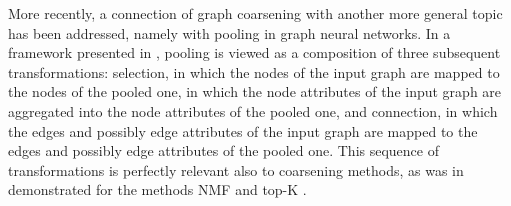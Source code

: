 More recently, a connection of graph coarsening with another more general topic has been addressed, namely with pooling in graph neural networks. In a framework presented in \cite{grattarola_understanding_2022}, pooling is viewed as a composition of three subsequent transformations: selection, in which the nodes of the input graph are mapped to the nodes of the pooled one, in which the node attributes of the input graph are aggregated into the node attributes of the pooled one, and connection, in which the edges and possibly edge attributes of the input graph are mapped to the edges and possibly edge attributes of the pooled one. This sequence of transformations is perfectly relevant also to coarsening methods, as was in \cite{grattarola_understanding_2022} demonstrated for the methods NMF \cite{bacciu_non-negative_2019} and top-K \cite{cangea_towards_2018,gao_graph_2019}.
